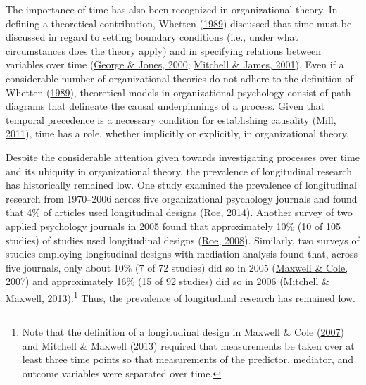 \documentclass[
12pt, %
twoside,
english]{guelphthesis}
\begin{document}
The importance of time has also been recognized in organizational theory. In defining a theoretical contribution, Whetten (\protect\hyperlink{ref-whetten1989}{1989}) discussed that time must be discussed in regard to setting boundary conditions (i.e., under what circumstances does the theory apply) and in specifying relations between variables over time (\protect\hyperlink{ref-george2000}{George \& Jones, 2000}; \protect\hyperlink{ref-mitchell2001}{Mitchell \& James, 2001}). Even if a considerable number of organizational theories do not adhere to the definition of Whetten (\protect\hyperlink{ref-whetten1989}{1989}), theoretical models in organizational psychology consist of path diagrams that delineate the causal underpinnings of a process. Given that temporal precedence is a necessary condition for establishing causality (\protect\hyperlink{ref-mill2011}{Mill, 2011}), time has a role, whether implicitly or explicitly, in organizational theory.





Despite the considerable attention given towards investigating processes over time and its ubiquity in organizational theory, the prevalence of longitudinal research has historically remained low. One study examined the prevalence of longitudinal research from 1970--2006 across five organizational psychology journals and found that 4\% of articles used longitudinal designs (Roe, 2014). Another survey of two applied psychology journals in 2005 found that approximately 10\% (10 of 105 studies) of studies used longitudinal designs (\protect\hyperlink{ref-roe2008}{Roe, 2008}). Similarly, two surveys of studies employing longitudinal designs with mediation analysis found that, across five journals, only about 10\% (7 of 72 studies) did so in 2005 (\protect\hyperlink{ref-maxwell2007}{Maxwell \& Cole, 2007}) and approximately 16\% (15 of 92 studies) did so in 2006 (\protect\hyperlink{ref-mitchell2013}{Mitchell \& Maxwell, 2013}).\footnote{Note that the definition of a longitudinal design in Maxwell \& Cole (\protect\hyperlink{ref-maxwell2007}{2007}) and Mitchell \& Maxwell (\protect\hyperlink{ref-mitchell2013}{2013}) required that measurements be taken over at least three time points so that measurements of the predictor, mediator, and outcome variables were separated over time.} Thus, the prevalence of longitudinal research has remained low.
\end{document}
